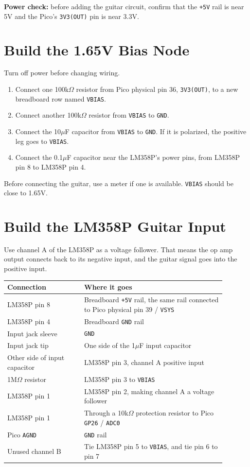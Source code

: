 \documentclass[11pt,letterpaper]{article}
\newcommand{\pin}[1]{\texttt{#1}}
\begin{document}
\textbf{Power check:} before adding the guitar circuit, confirm that the \texttt{+5V} rail is near 5V and the Pico's \texttt{3V3(OUT)} pin is near 3.3V.

\section*{Build the 1.65V Bias Node}
Turn off power before changing wiring.

\begin{enumerate}
    \item Connect one 100k$\Omega$ resistor from Pico physical pin 36, \texttt{3V3(OUT)}, to a new breadboard row named \texttt{VBIAS}.
    \item Connect another 100k$\Omega$ resistor from \texttt{VBIAS} to \texttt{GND}.
    \item Connect the 10$\mu$F capacitor from \texttt{VBIAS} to \texttt{GND}. If it is polarized, the positive leg goes to \texttt{VBIAS}.
    \item Connect the 0.1$\mu$F capacitor near the LM358P's power pins, from LM358P pin 8 to LM358P pin 4.
\end{enumerate}

Before connecting the guitar, use a meter if one is available. \texttt{VBIAS} should be close to 1.65V.

\section*{Build the LM358P Guitar Input}
Use channel A of the LM358P as a voltage follower. That means the op amp output connects back to its negative input, and the guitar signal goes into the positive input.

\begin{center}
\begin{tabular}{>{\raggedright\arraybackslash}p{0.31\linewidth} >{\raggedright\arraybackslash}p{0.58\linewidth}}
\toprule
Connection & Where it goes \\
\midrule
LM358P pin 8 & Breadboard \texttt{+5V} rail, the same rail connected to Pico physical pin 39 / \texttt{VSYS} \\
LM358P pin 4 & Breadboard \texttt{GND} rail \\
Input jack sleeve & \texttt{GND} \\
Input jack tip & One side of the 1$\mu$F input capacitor \\
Other side of input capacitor & LM358P pin 3, channel A positive input \\
1M$\Omega$ resistor & LM358P pin 3 to \texttt{VBIAS} \\
LM358P pin 1 & LM358P pin 2, making channel A a voltage follower \\
LM358P pin 1 & Through a 10k$\Omega$ protection resistor to Pico \pin{GP26} / \pin{ADC0} \\
Pico \pin{AGND} & \texttt{GND} rail \\
Unused channel B & Tie LM358P pin 5 to \texttt{VBIAS}, and tie pin 6 to pin 7 \\
\bottomrule
\end{tabular}
\end{center}
\end{document}
